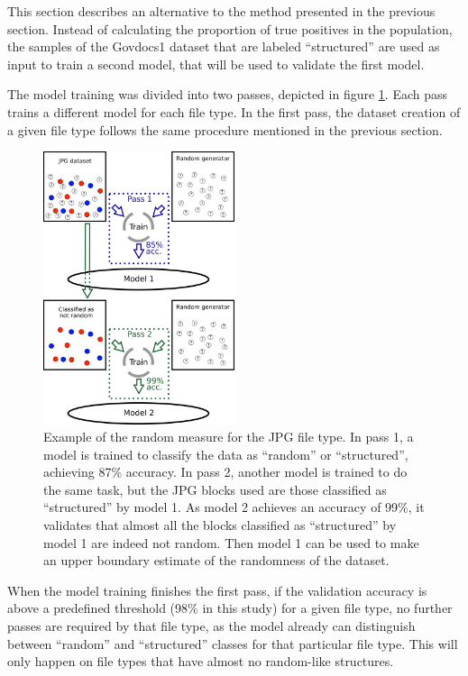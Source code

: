 This section describes an alternative to the method presented in the previous section. Instead of calculating the proportion of true positives in the population, the samples of the Govdocs1 dataset that are labeled ``structured'' are used as input to train a second model, that will be used to validate the first model.

The model training was divided into two passes, depicted in figure \ref{fig:randommeasure}. Each pass trains a different model for each file type. In the first pass, the dataset creation of a given file type follows the same procedure mentioned in the previous section.

\noindent
\begin{figure}[htb!]
\centering\includegraphics[width=0.5\textwidth]{content/random_measure.png}
\caption{\label{fig:randommeasure}Example of the random measure for the JPG file type. In pass 1, a model is trained to classify the data as ``random'' or ``structured'', achieving 87\% accuracy. In pass 2, another model is trained to do the same task, but the JPG blocks used are those classified as ``structured'' by model 1. As model 2 achieves an accuracy of 99\%, it validates that almost all the blocks classified as ``structured'' by model 1 are indeed not random. Then model 1 can be used to make an upper boundary estimate of the randomness of the dataset.}%
\end{figure}

When the model training finishes the first pass, if the validation accuracy is above a predefined threshold (98\% in this study) for a given file type, no further passes are required by that file type, as the model already can distinguish between ``random'' and ``structured'' classes for that particular file type. This will only happen on file types that have almost no random-like structures.

